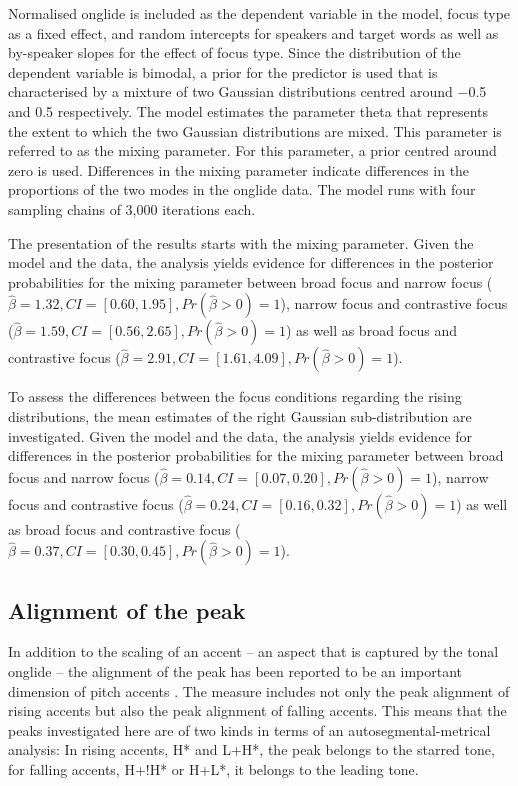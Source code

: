 Normalised onglide is included as the dependent variable in the model, focus type as a fixed effect, and random intercepts for speakers and target words as well as by-speaker slopes for the effect of focus type. Since the distribution of the dependent variable is bimodal, a prior for the predictor is used that is characterised by a mixture of two Gaussian distributions centred around −0.5 and 0.5 respectively. The model estimates the parameter theta that represents the extent to which the two Gaussian distributions are mixed. This parameter is referred to as the mixing parameter. For this parameter, a prior centred around zero is used. Differences in the mixing parameter indicate differences in the proportions of the two modes in the onglide data. The model runs with four sampling chains of 3,000 iterations each.

The presentation of the results starts with the mixing parameter. Given the model and the data, the analysis yields evidence for differences in the posterior probabilities for the mixing parameter between broad focus and narrow focus ($\hat\beta=1.32, CI=[0.60, 1.95], \allowbreak Pr(\hat\beta>0)=1$), narrow focus and contrastive focus ($\hat\beta=1.59, CI=[0.56, 2.65], \allowbreak Pr(\hat\beta>0)=1$) as well as broad focus and contrastive focus ($\hat\beta=2.91, CI=[1.61, 4.09], \allowbreak Pr(\hat\beta>0)=1$).

To assess the differences between the focus conditions regarding the rising distributions, the mean estimates of the right Gaussian sub-distribution are investigated. Given the model and the data, the analysis yields evidence for differences in the posterior probabilities for the mixing parameter between broad focus and narrow focus ($\hat\beta=0.14, CI=[0.07, 0.20], \allowbreak Pr(\hat\beta>0)=1$), narrow focus and contrastive focus ($\hat\beta=0.24, CI=[0.16, 0.32], \allowbreak Pr(\hat\beta>0)=1$) as well as broad focus and contrastive focus ($\hat\beta=0.37, CI=[0.30, 0.45], \allowbreak Pr(\hat\beta>0)=1$).

\subsection{Alignment of the peak}

In addition to the scaling of an accent -- an aspect that is captured by the tonal onglide -- the alignment of the peak has been reported to be an important dimension of pitch accents \citep[see also Chapter \ref{chapter_prosody}]{Gussenhoven2004, Ladd2008, LaddMorton1997}. The measure includes not only the peak alignment of rising accents but also the peak alignment of falling accents. This means that the peaks investigated here are of two kinds in terms of an autosegmental-metrical analysis: In rising accents, H* and L+H*, the peak belongs to the starred tone, for falling accents, H+!H* or H+L*, it belongs to the leading tone.

